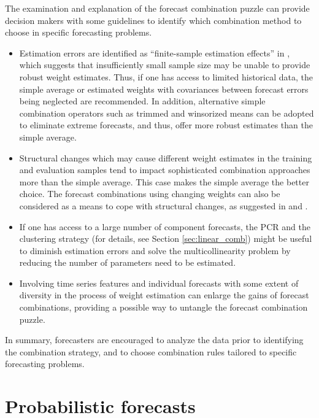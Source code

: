 \documentclass[11pt]{article}
\begin{document}
The examination and explanation of the forecast combination puzzle can provide decision makers with some guidelines to identify which combination method to choose in specific forecasting problems.
\begin{itemize}
  \item Estimation errors are identified as ``finite-sample estimation effects'' in \citet{Smith2009-wd}, which suggests that insufficiently small sample size may be unable to provide robust weight estimates. Thus, if one has access to limited historical data, the simple average or estimated weights with covariances between forecast errors being neglected are recommended. In addition, alternative simple combination operators such as trimmed and winsorized means can be adopted to eliminate extreme forecasts, and thus, offer more robust estimates than the simple average.
  \item Structural changes which may cause different weight estimates in the training and evaluation samples tend to impact sophisticated combination approaches more than the simple average. This case makes the simple average the better choice. The forecast combinations using changing weights can also be considered as a means to cope with structural changes, as suggested in \citet{Diebold1987-go} and \citet{Deutsch1994-ob}.
  \item If one has access to a large number of component forecasts, the PCR and the clustering strategy (for details, see Section \ref{sec:linear_comb}) might be useful to diminish estimation errors and solve the multicollinearity problem by reducing the number of parameters need to be estimated.
  \item Involving time series features and individual forecasts with some extent of diversity in the process of weight estimation can enlarge the gains of forecast combinations, providing a possible way to untangle the forecast combination puzzle.
\end{itemize}
In summary, forecasters are encouraged to analyze the data prior to identifying the combination strategy, and to choose combination rules tailored to specific forecasting problems.


\section{Probabilistic forecasts}
\label{sec:probabilistic_forecasts}
\end{document}

